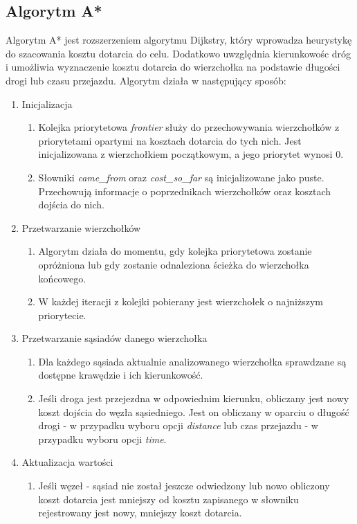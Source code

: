 \documentclass{article}
\begin{document}
\subsection{Algorytm A*}
Algorytm A* jest rozszerzeniem algorytmu Dijkstry, który wprowadza heurystykę do szacowania kosztu dotarcia do celu. Dodatkowo uwzględnia kierunkowośc dróg i umożliwia wyznaczenie kosztu dotarcia do wierzchołka na podstawie długości drogi lub czasu przejazdu.
Algorytm działa w następujący sposób:
\begin{enumerate}
    \item Inicjalizacja 
    \begin{enumerate}
        \item Kolejka priorytetowa \textit{frontier} służy do przechowywania wierzchołków z priorytetami opartymi na kosztach dotarcia do tych nich. Jest inicjalizowana z wierzchołkiem początkowym, a jego priorytet wynosi 0.
        \item Słowniki \textit{came\_from} oraz \textit{cost\_so\_far} są inicjalizowane jako puste. Przechowują informacje o poprzednikach wierzchołków oraz kosztach dojścia do nich.
    \end{enumerate}
    \item Przetwarzanie wierzchołków
    \begin{enumerate}
        \item Algorytm działa do momentu, gdy kolejka priorytetowa zostanie opróżniona lub gdy zostanie odnaleziona ścieżka do wierzchołka końcowego.
        \item W każdej iteracji z kolejki pobierany jest wierzchołek o najniższym priorytecie.
    \end{enumerate}
    \item Przetwarzanie sąsiadów danego wierzchołka
    \begin{enumerate}
        \item Dla każdego sąsiada aktualnie analizowanego wierzchołka sprawdzane są dostępne krawędzie i ich kierunkowość.
        \item Jeśli droga jest przejezdna w odpowiednim kierunku, obliczany jest nowy koszt dojścia do węzła sąsiedniego.
        Jest on obliczany w oparciu o długość drogi - w przypadku wyboru opcji \textit{distance} lub czas przejazdu - w przypadku wyboru opcji \textit{time}.
    \end{enumerate}
    \item Aktualizacja wartości
    \begin{enumerate}
        \item Jeśli węzeł - sąsiad nie został jeszcze odwiedzony lub nowo obliczony koszt dotarcia jest mniejszy od kosztu zapisanego w słowniku rejestrowany jest nowy, mniejszy koszt dotarcia.

\end{enumerate}
\end{enumerate}
\end{document}
